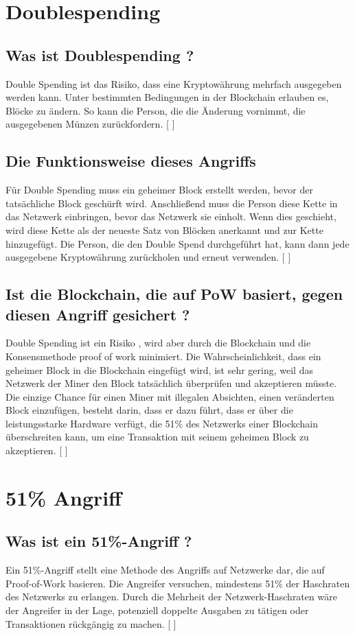 \documentclass[ngerman]{scrreprt}
\begin{document}
\section{Doublespending}
\subsection{Was ist Doublespending ?}
Double Spending ist das Risiko, dass eine Kryptowährung mehrfach ausgegeben werden kann. Unter bestimmten Bedingungen in der Blockchain erlauben es, Blöcke zu ändern. So kann die Person, die die Änderung vornimmt, die ausgegebenen Münzen zurückfordern. [ \cite{double_spending_attack} ]
\subsection{Die Funktionsweise dieses Angriffs}
Für Double Spending muss ein geheimer Block erstellt werden, bevor der tatsächliche Block geschürft wird. Anschließend muss die Person diese Kette in das Netzwerk einbringen, bevor das Netzwerk sie einholt. Wenn dies geschieht, wird diese Kette als der neueste Satz von Blöcken anerkannt und zur Kette hinzugefügt. Die Person, die den Double Spend durchgeführt hat, kann dann jede ausgegebene Kryptowährung zurückholen und erneut verwenden. [ \cite{double_spending_attack} ]
\subsection{Ist die Blockchain, die auf PoW basiert, gegen diesen Angriff gesichert ?}
Double Spending ist ein Risiko , wird aber durch die Blockchain und die Konsensmethode proof of work minimiert. Die Wahrscheinlichkeit, dass ein geheimer Block in die Blockchain eingefügt wird, ist sehr gering, weil das Netzwerk der Miner den Block tatsächlich überprüfen und akzeptieren müsste. Die einzige Chance für einen Miner mit illegalen Absichten, einen veränderten Block einzufügen, besteht darin, dass er dazu führt, dass er über die leistungsstarke Hardware verfügt, die 51\% des Netzwerks einer Blockchain überschreiten kann, um eine Transaktion mit seinem geheimen Block zu akzeptieren. [ \cite{double_spending_attack} ]

\section{51\% Angriff}\label{blockchain:doublespending}
\subsection{Was ist ein 51\%-Angriff ?}
Ein 51\%-Angriff stellt eine Methode des Angriffs auf Netzwerke dar, die auf Proof-of-Work basieren. Die Angreifer versuchen, mindestens 51\% der Haschraten des Netzwerks zu erlangen. Durch die Mehrheit der Netzwerk-Haschraten wäre der Angreifer in der Lage, potenziell doppelte Ausgaben zu tätigen oder Transaktionen rückgängig zu machen. [ \cite{51attack} ]
\end{document}
